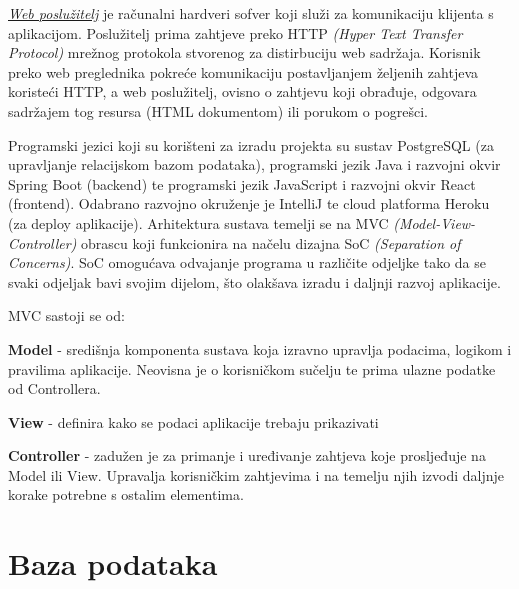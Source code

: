 		\textit{\underline{Web poslužitelj}} je računalni hardveri sofver koji služi za komunikaciju klijenta s aplikacijom. Poslužitelj prima zahtjeve preko HTTP \textit{(Hyper Text Transfer Protocol)} mrežnog protokola stvorenog za distirbuciju web sadržaja. Korisnik preko web preglednika pokreće komunikaciju postavljanjem željenih zahtjeva koristeći HTTP, a web poslužitelj, ovisno o zahtjevu koji obrađuje, odgovara sadržajem tog resursa (HTML dokumentom) ili porukom o pogrešci.
		
		Programski jezici koji su korišteni za izradu projekta su  sustav PostgreSQL (za upravljanje relacijskom bazom podataka), programski jezik Java i razvojni okvir Spring Boot (backend) te programski jezik JavaScript i razvojni okvir React (frontend). Odabrano razvojno okruženje je IntelliJ te cloud platforma Heroku (za deploy aplikacije). Arhitektura sustava temelji se na MVC \textit{(Model-View-Controller)} obrascu koji funkcionira na načelu dizajna SoC \textit{(Separation of Concerns)}. SoC omogućava odvajanje programa u različite odjeljke tako da se svaki odjeljak bavi svojim dijelom, što olakšava izradu i daljnji razvoj aplikacije.
		
		MVC sastoji se od:
		\begin{packed_item}
			\item \textbf{Model} - središnja komponenta sustava koja izravno upravlja podacima, logikom i pravilima aplikacije. Neovisna je o korisničkom sučelju te prima ulazne podatke od Controllera.
			
			\item \textbf{View} - definira kako se podaci aplikacije trebaju prikazivati
			
			\item \textbf{Controller} - zadužen je za primanje i uređivanje zahtjeva koje prosljeđuje na Model ili View. Upravalja korisničkim zahtjevima i na temelju njih izvodi daljnje korake potrebne s ostalim elementima.
		\end{packed_item}
		
		\eject
		

				
		\section{Baza podataka}
			
%			

